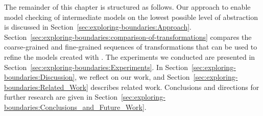 The remainder of this chapter is structured as follows.
Our approach to enable model checking of intermediate models on the lowest possible level of abstraction is discussed in Section~\ref{sec:exploring-boundaries:Approach}.
Section~\ref{sec:exploring-boundaries:comparison-of-transformations} compares the coarse-grained and fine-grained sequences of transformations that can be used to refine the models created with \SLCO.
The experiments we conducted are presented in Section~\ref{sec:exploring-boundaries:Experiments}.
In Section~\ref{sec:exploring-boundaries:Discussion}, we reflect on our work, and Section~\ref{sec:exploring-boundaries:Related_Work} describes related work.
Conclusions and directions for further research are given in Section~\ref{sec:exploring-boundaries:Conclusions_and_Future_Work}. 